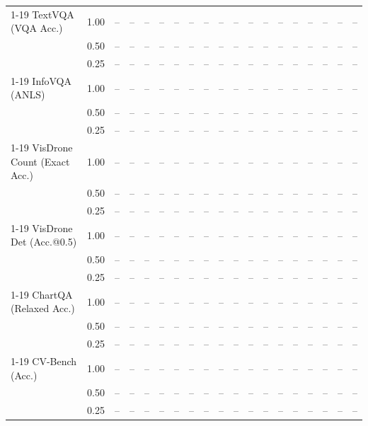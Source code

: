 \begin{table}[t]
{\begin{tabular}{l c | c c c c | c c c c | c c | c c c | c c c c}
\cmidrule(lr){1-19}
TextVQA (VQA Acc.) & 1.00 & -- & -- & -- & -- & -- & -- & -- & -- & -- & -- & -- & -- & -- & -- & -- & -- & -- \\
 & 0.50 & -- & -- & -- & -- & -- & -- & -- & -- & -- & -- & -- & -- & -- & -- & -- & -- & -- \\
 & 0.25 & -- & -- & -- & -- & -- & -- & -- & -- & -- & -- & -- & -- & -- & -- & -- & -- & -- \\
\cmidrule(lr){1-19}
InfoVQA (ANLS) & 1.00 & -- & -- & -- & -- & -- & -- & -- & -- & -- & -- & -- & -- & -- & -- & -- & -- & -- \\
 & 0.50 & -- & -- & -- & -- & -- & -- & -- & -- & -- & -- & -- & -- & -- & -- & -- & -- & -- \\
 & 0.25 & -- & -- & -- & -- & -- & -- & -- & -- & -- & -- & -- & -- & -- & -- & -- & -- & -- \\
\cmidrule(lr){1-19}
VisDrone Count (Exact Acc.) & 1.00 & -- & -- & -- & -- & -- & -- & -- & -- & -- & -- & -- & -- & -- & -- & -- & -- & -- \\
 & 0.50 & -- & -- & -- & -- & -- & -- & -- & -- & -- & -- & -- & -- & -- & -- & -- & -- & -- \\
 & 0.25 & -- & -- & -- & -- & -- & -- & -- & -- & -- & -- & -- & -- & -- & -- & -- & -- & -- \\
\cmidrule(lr){1-19}
VisDrone Det (Acc.@0.5) & 1.00 & -- & -- & -- & -- & -- & -- & -- & -- & -- & -- & -- & -- & -- & -- & -- & -- & -- \\
 & 0.50 & -- & -- & -- & -- & -- & -- & -- & -- & -- & -- & -- & -- & -- & -- & -- & -- & -- \\
 & 0.25 & -- & -- & -- & -- & -- & -- & -- & -- & -- & -- & -- & -- & -- & -- & -- & -- & -- \\
\cmidrule(lr){1-19}
ChartQA (Relaxed Acc.) & 1.00 & -- & -- & -- & -- & -- & -- & -- & -- & -- & -- & -- & -- & -- & -- & -- & -- & -- \\
 & 0.50 & -- & -- & -- & -- & -- & -- & -- & -- & -- & -- & -- & -- & -- & -- & -- & -- & -- \\
 & 0.25 & -- & -- & -- & -- & -- & -- & -- & -- & -- & -- & -- & -- & -- & -- & -- & -- & -- \\
\cmidrule(lr){1-19}
CV-Bench (Acc.) & 1.00 & -- & -- & -- & -- & -- & -- & -- & -- & -- & -- & -- & -- & -- & -- & -- & -- & -- \\
 & 0.50 & -- & -- & -- & -- & -- & -- & -- & -- & -- & -- & -- & -- & -- & -- & -- & -- & -- \\
 & 0.25 & -- & -- & -- & -- & -- & -- & -- & -- & -- & -- & -- & -- & -- & -- & -- & -- & -- \\

\end{tabular}}
\end{table}
